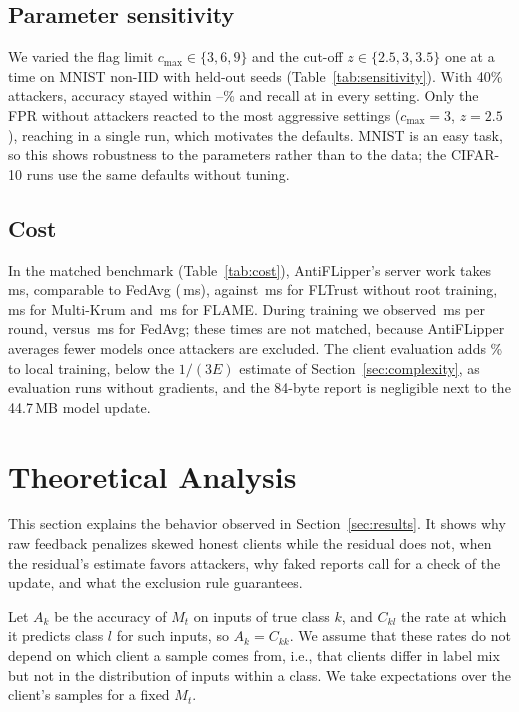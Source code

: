 \documentclass[journal]{IEEEtran}
\begin{document}
\subsection{Parameter sensitivity}
\label{sec:res-sens}

We varied the flag limit $c_{\max}\in\{3,6,9\}$ and the cut-off $z\in\{2.5,3,3.5\}$ one at a time on MNIST non-IID with held-out seeds (Table~\ref{tab:sensitivity}). With 40\% attackers, accuracy stayed within \sensAccMin--\sensAccMax\% and recall at \sensRecallMin{} in every setting. Only the FPR without attackers reacted to the most aggressive settings ($c_{\max}{=}3$, $z{=}2.5$), reaching \sensFPRmax{} in a single run, which motivates the defaults. MNIST is an easy task, so this shows robustness to the parameters rather than to the data; the CIFAR-10 runs use the same defaults without tuning.

\subsection{Cost}
\label{sec:res-cost}

In the matched benchmark (Table~\ref{tab:cost}), AntiFLipper's server work takes \matchedOurs\,ms, comparable to FedAvg (\matchedFedAvg\,ms), against \matchedFLTrust\,ms for FLTrust without root training, \matchedKrum\,ms for Multi-Krum and \matchedFLAME\,ms for FLAME. During training we observed \,ms per round, versus \,ms for FedAvg; these times are not matched, because AntiFLipper averages fewer models once attackers are excluded. The client evaluation adds \evalOverhead\% to local training, below the $1/(3E)$ estimate of Section~\ref{sec:complexity}, as evaluation runs without gradients, and the 84-byte report is negligible next to the 44.7\,MB model update.

\section{Theoretical Analysis}
\label{sec:analysis}
This section explains the behavior observed in Section~\ref{sec:results}. It shows why raw feedback penalizes skewed honest clients while the residual does not, when the residual's estimate favors attackers, why faked reports call for a check of the update, and what the exclusion rule guarantees.

Let $A_k$ be the accuracy of $M_t$ on inputs of true class $k$, and $C_{kl}$ the rate at which it predicts class $l$ for such inputs, so $A_k=C_{kk}$. We assume that these rates do not depend on which client a sample comes from, i.e., that clients differ in label mix but not in the distribution of inputs within a class. We take expectations over the client's samples for a fixed $M_t$.
\end{document}
